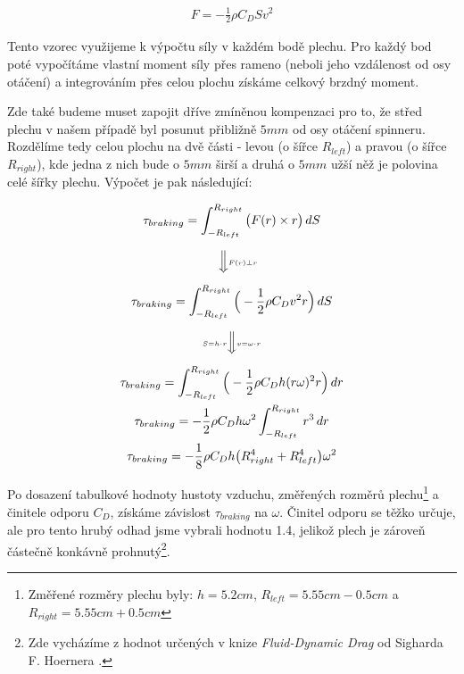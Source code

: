 \begin{equation}
    \label{eq:highschool_drag}
    \begin{gathered}
        F = -\frac{1}{2} \rho C_D S v^2
    \end{gathered}
\end{equation}

\clearpage

Tento vzorec využijeme k výpočtu síly v každém bodě plechu. Pro každý bod poté vypočítáme vlastní moment síly přes rameno (neboli jeho vzdálenost od osy otáčení) a integrováním přes celou plochu získáme celkový brzdný moment.

Zde také budeme muset zapojit dříve zmíněnou kompenzaci pro to, že střed plechu v našem případě byl posunut přibližně $5mm$ od osy otáčení spinneru. Rozdělíme tedy celou plochu na dvě části - levou (o šířce $R_{left}$) a pravou (o šířce $R_{right}$), kde jedna z nich bude o $5mm$ širší a druhá o $5mm$ užší něž je polovina celé šířky plechu. Výpočet je pak následující:

\begin{equation}
    \label{eq:braking_torque}
    \begin{gathered}
        \tau_{braking} = \int_{-R_{left}}^{R_{right}} \big( F(r) \times r \big) \,dS \\
        \quad \Big\Downarrow \scriptscriptstyle{F(r) \perp r} \vphantom{\Bigg(} \\
        \tau_{braking} = \int_{-R_{left}}^{R_{right}} \Big( -\frac{1}{2} \rho C_D v^2 r \Big) \,dS \\
        \scriptscriptstyle{S = h \cdot r} \Big\Downarrow \scriptscriptstyle{v = \omega \cdot r} \vphantom{\Bigg(} \\
        \tau_{braking} = \int_{-R_{left}}^{R_{right}} \Big( -\frac{1}{2} \rho C_D h (r \omega)^2 r \Big) \,dr \\
        \tau_{braking} = -\frac{1}{2} \rho C_D h \omega^2 \int_{-R_{left}}^{R_{right}} r^3 \,dr \\
        \tau_{braking} = -\frac{1}{8} \rho C_D h \big( R_{right}^4 + R_{left}^4 \big) \omega^2
    \end{gathered}
\end{equation}

Po dosazení tabulkové hodnoty hustoty vzduchu, změřených rozměrů plechu\footnote{Změřené rozměry plechu byly: $h = 5.2cm$, $R_{left} = 5.55cm - 0.5cm$ a $R_{right} = 5.55cm + 0.5cm$} a činitele odporu $C_D$, získáme závislost $\tau_{braking}$ na $\omega$. Činitel odporu se těžko určuje, ale pro tento hrubý odhad jsme vybrali hodnotu 1.4, jelikož plech je zároveň částečně konkávně prohnutý\footnote{Zde vycházíme z hodnot určených v knize \textit{Fluid-Dynamic Drag} od Sigharda F. Hoernera \cite{plate_drag_coef}.}.

